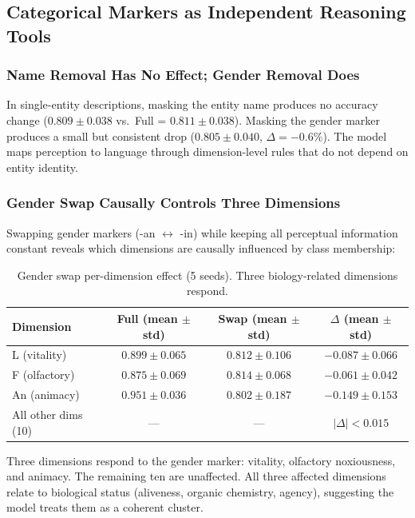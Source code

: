 \documentclass{article}
\begin{document}
\subsection{Categorical Markers as Independent Reasoning Tools}

\subsubsection{Name Removal Has No Effect; Gender Removal Does}

In single-entity descriptions, masking the entity name produces no accuracy change ($0.809 \pm 0.038$ vs.\ Full = $0.811 \pm 0.038$). Masking the gender marker produces a small but consistent drop ($0.805 \pm 0.040$, $\Delta = -0.6\%$). The model maps perception to language through dimension-level rules that do not depend on entity identity.

\subsubsection{Gender Swap Causally Controls Three Dimensions}

Swapping gender markers (-an $\leftrightarrow$ -in) while keeping all perceptual information constant reveals which dimensions are causally influenced by class membership:

\begin{table}[htbp]
\centering
\small
\begin{tabular}{lccc}
\toprule
Dimension & Full (mean $\pm$ std) & Swap (mean $\pm$ std) & $\Delta$ (mean $\pm$ std) \\
\midrule
L (vitality) & $0.899 \pm 0.065$ & $0.812 \pm 0.106$ & $-0.087 \pm 0.066$ \\
F (olfactory) & $0.875 \pm 0.069$ & $0.814 \pm 0.068$ & $-0.061 \pm 0.042$ \\
An (animacy) & $0.951 \pm 0.036$ & $0.802 \pm 0.187$ & $-0.149 \pm 0.153$ \\
All other dims (10) & --- & --- & $|\Delta| < 0.015$ \\
\bottomrule
\end{tabular}
\caption{Gender swap per-dimension effect (5 seeds). Three biology-related dimensions respond.}
\label{tab:genderswap}
\end{table}

Three dimensions respond to the gender marker: vitality, olfactory noxiousness, and animacy. The remaining ten are unaffected. All three affected dimensions relate to biological status (aliveness, organic chemistry, agency), suggesting the model treats them as a coherent cluster.
\end{document}
